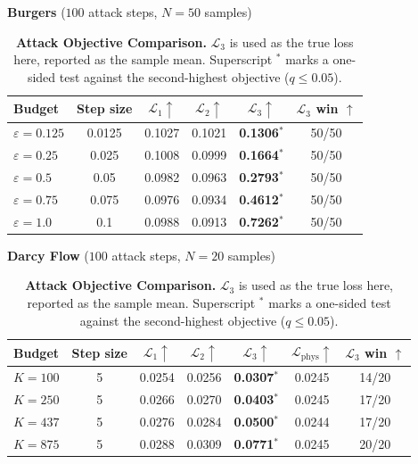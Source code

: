 \documentclass[letterpaper]{article} %
\begin{document}
\begin{table}[t]
\centering
\normalsize
\setlength{\tabcolsep}{1.1pt}
\renewcommand{\arraystretch}{0.95}
\caption{\textbf{Attack Objective Comparison.} \(\mathcal L_3\) is used as the
true loss here, reported as the sample mean. Superscript \(^{*}\) marks a
one-sided test against the second-highest objective (\(q\le 0.05\)).}
\label{tab:attack_objective_true_l3_summary}
\textbf{Burgers} (\(100\) attack steps, \(N=50\) samples)\\[0.15em]
\begin{tabular}{@{}lccccc@{}}
\toprule
Budget & Step size & \(\mathcal L_1 \uparrow\) & \(\mathcal L_2 \uparrow\) &
\(\boldsymbol{\mathcal L}_3 \uparrow\) & \(\mathcal L_3\) win \(\uparrow\) \\
\midrule
\(\varepsilon=0.125\) & 0.0125 & 0.1027 & 0.1021 & \textbf{0.1306}\(^{*}\) & 50/50 \\
\(\varepsilon=0.25\) & 0.025 & 0.1008 & 0.0999 & \textbf{0.1664}\(^{*}\) & 50/50 \\
\(\varepsilon=0.5\) & 0.05 & 0.0982 & 0.0963 & \textbf{0.2793}\(^{*}\) & 50/50 \\
\(\varepsilon=0.75\) & 0.075 & 0.0976 & 0.0934 & \textbf{0.4612}\(^{*}\) & 50/50 \\
\(\varepsilon=1.0\) & 0.1 & 0.0988 & 0.0913 & \textbf{0.7262}\(^{*}\) & 50/50 \\
\bottomrule
\end{tabular}

\vspace{0.1em}
\setlength{\tabcolsep}{0.6pt}
\textbf{Darcy Flow} (\(100\) attack steps, \(N=20\) samples)\\[0.15em]
\begin{tabular}{@{}lcccccc@{}}
\toprule
Budget & Step size & \(\mathcal L_1 \uparrow\) & \(\mathcal L_2 \uparrow\) &
\(\boldsymbol{\mathcal L}_3 \uparrow\) & \(\mathcal L_{\mathrm{phys}} \uparrow\) &
\(\mathcal L_3\) win \(\uparrow\) \\
\midrule
$K=100$ & 5 & 0.0254 & 0.0256 & \textbf{0.0307}\(^{*}\) & 0.0245 & 14/20 \\
$K=250$ & 5 & 0.0266 & 0.0270 & \textbf{0.0403}\(^{*}\) & 0.0245 & 17/20 \\
$K=437$ & 5 & 0.0276 & 0.0284 & \textbf{0.0500}\(^{*}\) & 0.0244 & 17/20 \\
$K=875$ & 5 & 0.0288 & 0.0309 & \textbf{0.0771}\(^{*}\) & 0.0245 & 20/20 \\
\bottomrule
\end{tabular}


\end{table}
\end{document}
